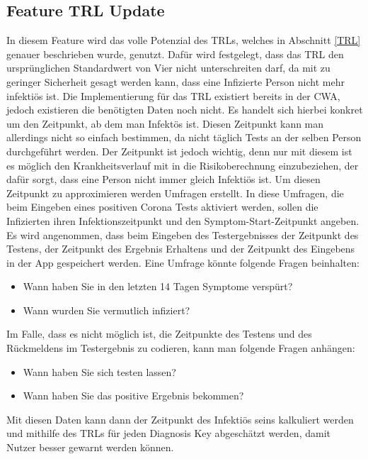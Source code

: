 \documentclass[conference,compsoc]{IEEEtran}
\begin{document}
\subsection{Feature TRL Update}
\label{Feature TRL Update}
In diesem Feature wird das volle Potenzial des TRLs, welches in Abschnitt \ref{TRL} genauer beschrieben wurde, genutzt. Dafür wird festgelegt, dass das TRL den ursprünglichen Standardwert von Vier nicht unterschreiten darf,
da mit zu geringer Sicherheit gesagt werden kann, dass eine Infizierte Person nicht mehr infektiös ist. 
Die Implementierung für das TRL existiert bereits in der CWA, jedoch existieren die benötigten Daten noch nicht.
Es handelt sich hierbei konkret um den Zeitpunkt, ab dem man Infektös ist. 
Diesen Zeitpunkt kann man allerdings nicht so einfach bestimmen, da nicht täglich Tests an der selben Person durchgeführt werden.
Der Zeitpunkt ist jedoch wichtig, denn nur mit diesem ist es möglich den Krankheitsverlauf mit in die Risikoberechnung einzubeziehen,
der dafür sorgt, dass eine Person nicht immer gleich Infektiös ist. 
Um diesen Zeitpunkt zu approximieren werden Umfragen erstellt.  
In diese Umfragen, die beim Eingeben eines positiven Corona Tests aktiviert werden, sollen die Infizierten ihren Infektionszeitpunkt und den Symptom-Start-Zeitpunkt angeben. 
Es wird angenommen, dass beim Eingeben des Testergebnisses der Zeitpunkt des Testens, der Zeitpunkt des Ergebnis Erhaltens und der Zeitpunkt des Eingebens in der App gespeichert werden. 
Eine Umfrage könnte folgende Fragen beinhalten:

\begin{itemize}
	\item Wann haben Sie in den letzten 14 Tagen Symptome verspürt?
	\item Wann wurden Sie vermutlich infiziert?
\end{itemize}

Im Falle, dass es nicht möglich ist, die Zeitpunkte des Testens und des Rückmeldens im Testergebnis zu codieren, kann man folgende Fragen anhängen:

\begin{itemize}
	\item Wann haben Sie sich testen lassen?
	\item Wann haben Sie das positive Ergebnis bekommen?
\end{itemize} 
	
Mit diesen Daten kann dann der Zeitpunkt des Infektiös seins kalkuliert werden und mithilfe des TRLs für jeden Diagnosis Key abgeschätzt werden,
damit Nutzer besser gewarnt werden können.
\end{document}
